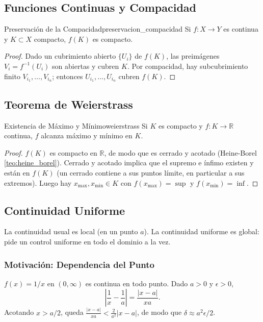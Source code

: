 \documentclass[11pt, a4paper]{article}
\begin{document}
\subsection{Funciones Continuas y Compacidad}

\begin{teorema}{Preservación de la Compacidad}{preservacion_compacidad}
Si $f: X \to Y$ es continua y $K \subset X$ compacto, $f(K)$ es compacto.
\end{teorema}

\begin{proof}
Dado un cubrimiento abierto $\{U_i\}$ de $f(K)$, las preimágenes $V_i = f^{-1}(U_i)$ son abiertas
y cubren $K$. Por compacidad, hay subcubrimiento finito $V_{i_1}, \dots, V_{i_n}$; entonces
$U_{i_1}, \dots, U_{i_n}$ cubren $f(K)$.
\end{proof}

\subsection{Teorema de Weierstrass}

\begin{corolario}{Existencia de Máximo y Mínimo}{weierstrass}
Si $K$ es compacto y $f: K \to \mathbb{R}$ continua, $f$ alcanza máximo y mínimo en $K$.
\end{corolario}

\begin{proof}
$f(K)$ es compacto en $\mathbb{R}$, de modo que es cerrado y acotado (Heine-Borel
\ref{teo:heine_borel}). Cerrado y acotado
implica que el supremo e ínfimo existen y están en $f(K)$ (un cerrado contiene a sus puntos
límite, en particular a sus extremos). Luego hay $x_{\max}, x_{\min} \in K$ con
$f(x_{\max}) = \sup$ y $f(x_{\min}) = \inf$.
\end{proof}

\subsection{Continuidad Uniforme}

La continuidad usual es local (en un punto $a$). La continuidad uniforme es global: pide un control
uniforme en todo el dominio a la vez.

\subsubsection{Motivación: Dependencia del Punto}

$f(x) = 1/x$ en $(0, \infty)$ es continua en todo punto. Dado $a > 0$ y $\epsilon > 0$,
$$ \left|\frac{1}{x} - \frac{1}{a}\right| = \frac{|x-a|}{xa}. $$
Acotando $x > a/2$, queda $\frac{|x-a|}{xa} < \frac{2}{a^2}|x-a|$, de modo que
$\delta \approx a^2 \epsilon / 2$.
\end{document}
